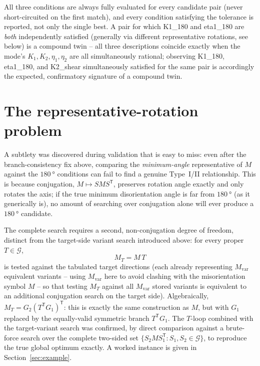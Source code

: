 \documentclass[11pt]{article}
\newcommand{\Kone}{K_1}
\newcommand{\Ktwo}{K_2}
\newcommand{\etaone}{\eta_1}
\newcommand{\etatwo}{\eta_2}
\begin{document}
All three conditions are always fully evaluated for every candidate pair
(never short-circuited on the first match), and every condition
satisfying the tolerance is reported, not only the single best. A pair
for which K1\_180 and eta1\_180 are \emph{both} independently satisfied
(generally via different representative rotations, see below) is a
compound twin -- all three descriptions coincide exactly when the mode's
$\Kone,\Ktwo,\etaone,\etatwo$ are all simultaneously rational; observing
K1\_180, eta1\_180, and K2\_shear simultaneously satisfied for the same
pair is accordingly the expected, confirmatory signature of a compound
twin.

\section{The representative-rotation problem}

A subtlety was discovered during validation that is easy to miss: even
after the branch-consistency fix above, comparing the \emph{minimum-angle}
representative of $M$ against the $\SI{180}{\degree}$ conditions can fail
to find a genuine Type~I/II relationship. This is because conjugation,
$M \mapsto S M S^{\mathsf T}$, preserves rotation angle exactly and only
rotates the axis; if the true minimum disorientation angle is far from
$\SI{180}{\degree}$ (as it generically is), no amount of searching over
conjugation alone will ever produce a $\SI{180}{\degree}$ candidate.

The complete search requires a second, non-conjugation degree of freedom,
distinct from the target-side variant search introduced above: for every
proper $T \in \mathcal G$,
\begin{equation}
  M_T = M\,T
\end{equation}
is tested against the tabulated target directions (each already
representing $M_{\text{var}}$ equivalent variants -- using $M_{\text{var}}$
here to avoid clashing with the misorientation symbol $M$ -- so that
testing $M_T$ against all $M_{\text{var}}$ stored variants is equivalent
to an additional conjugation search on the target side). Algebraically,
$M_T = G_2 (T^{\mathsf T} G_1)^{\mathsf T}$: this is exactly the same
construction as $M$, but with $G_1$ replaced by the equally-valid
symmetric branch $T^{\mathsf T} G_1$. The $T$-loop combined with the
target-variant search was confirmed, by direct comparison against a
brute-force search over the complete two-sided set $\{S_2 M
S_1^{\mathsf T} : S_1,S_2\in\mathcal G\}$, to reproduce the true global
optimum exactly. A worked instance is given in Section~\ref{sec:example}.
\end{document}
